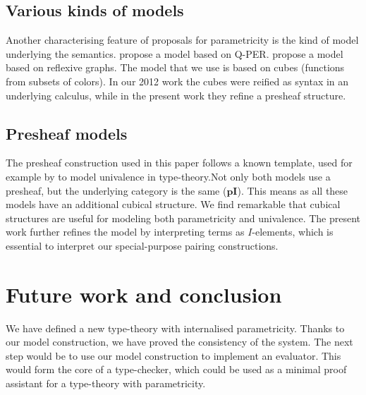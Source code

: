\documentclass[english]{PaperTools/latex/lipics}
\def\pI{\ensuremath{\mathbf{pI}}}
\begin{document}
\subsection{Various kinds of models}
Another characterising feature of proposals for parametricity is the
kind of model underlying the
semantics.  propose a model
based on Q-PER.  propose a model based
on reflexive graphs. The model that we use is based on cubes
(functions from subsets of colors). In
our 2012 work the cubes were reified as syntax in
an underlying calculus, while in the present work they refine a presheaf structure.

\subsection{Presheaf models}

The presheaf construction used in this paper follows a known template,
used for example by \citet{bezem2014model,DBLP:journals/corr/Pitts14}
to model univalence in type-theory.Not only both models use a
presheaf, but the underlying category is the same ($\pI$). This means
as all these models have an additional cubical structure.  We find
remarkable that cubical structures are useful for modeling both
parametricity and univalence. The present work further refines the
model by interpreting terms as $I$-elements, which is essential to
interpret our special-purpose pairing constructions.

\section{Future work and conclusion}
We have defined a new type-theory with internalised parametricity.
Thanks to our model construction, we have proved the consistency of
the system. The next step would be to use our model construction to
implement an evaluator. This would form the core of a type-checker,
which could be used as a minimal proof assistant for a type-theory
with parametricity.



\end{document}
